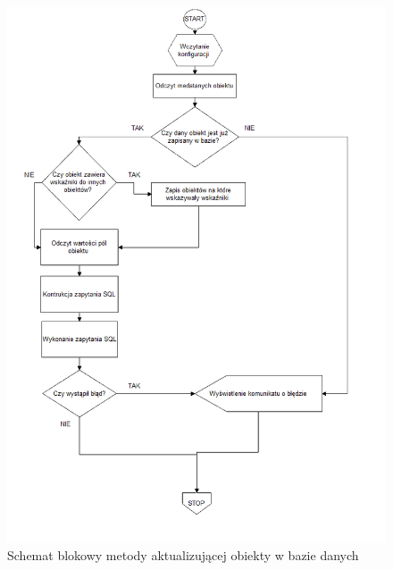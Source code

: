 \documentclass[12pt]{report}
\begin{document}
\begin{figure}[H]
\centering
\includegraphics[width=\textwidth]{resources/update_schema.png}
\caption{Schemat blokowy metody aktualizującej obiekty w bazie danych}
\label{blok2}
\end{figure}
\end{document}
